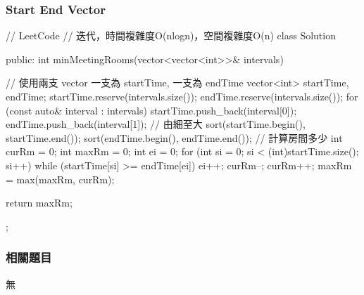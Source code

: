 \subsubsection{Start End Vector}
\begin{Code}
// LeetCode
// 迭代，時間複雜度O(nlogn)，空間複雜度O(n)
class Solution {
public:
    int minMeetingRooms(vector<vector<int>>& intervals) {
        // 使用兩支 vector 一支為 startTime, 一支為 endTime
        vector<int> startTime, endTime;
        startTime.reserve(intervals.size());
        endTime.reserve(intervals.size());
        for (const auto& interval : intervals)
        {
            startTime.push_back(interval[0]);
            endTime.push_back(interval[1]);
        }
        // 由細至大
        sort(startTime.begin(), startTime.end());
        sort(endTime.begin(), endTime.end());
        // 計算房間多少
        int curRm = 0;
        int maxRm = 0;
        int ei = 0;
        for (int si = 0; si < (int)startTime.size(); si++)
        {
            while (startTime[si] >= endTime[ei])
            {
                ei++;
                curRm--;
            }
            curRm++;
            maxRm = max(maxRm, curRm);
        }

        return maxRm;
    }
};
\end{Code}

\subsubsection{相關題目}
\begindot
\item 無
\myenddot
